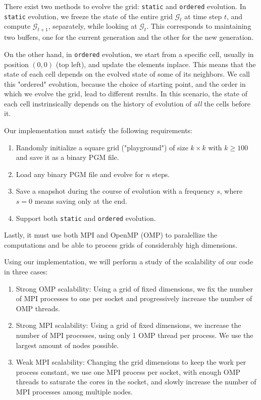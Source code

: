 \documentclass{report}
\begin{document}
There exist two methods to evolve the grid: \texttt{static} and \texttt{ordered}
evolution. In \texttt{static} evolution, we freeze the state of the entire grid 
$\mathcal{G}_t$ at time step $t$, and compute $\mathcal{G}_{t+1}$, separately, 
while looking at $\mathcal{G}_t$. This corresponds to maintaining two buffers, 
one for the current generation and the other for the new generation.

On the other hand, in \texttt{ordered} evolution, we start from a specific cell, 
usually in position $(0,0)$ (top left), and update the elements inplace. This 
means that the state of each cell depends on the evolved state of some of its 
neighbors. We call this "ordered" evolution, because the choice of starting 
point, and the order in which we evolve the grid, lead to different results.
In this scenario, the state of each cell instrinsically depends on the history of 
evolution of \textit{all} the cells before it. 

Our implementation must satisfy the following requirements: 

\begin{enumerate}
    \item Randomly initialize a square grid ("playground") of size $k \times k$ 
        with $k \geq 100$ and save it as a binary PGM\cite{pgm} file.
    \item Load any binary PGM file and evolve for $n$ steps.
    \item Save a snapshot during the course of evolution with a frequency $s$, 
        where $s=0$ means saving only at the end. 
    \item Support both \texttt{static} and \texttt{ordered} evolution.
\end{enumerate}

Lastly, it must use both MPI\cite{mpi} and OpenMP\cite{omp} (OMP) to paralellize 
the computations and be able to process grids of considerably high dimensions. 

Using our implementation, we will perform a study of the scalability of our code 
in three cases: 
\begin{enumerate}
    \item Strong OMP scalability: Using a grid of fixed dimensions, we fix the 
        number of MPI processes to one per socket and progressively increase 
        the number of OMP threads.
    \item Strong MPI scalability: Using a grid of fixed dimensions, we increase 
        the number of MPI processes, using only 1 OMP thread per process. We use 
        the largest amount of nodes possible.
    \item Weak MPI scalability: Changing the grid dimensions to keep the work per 
        process constant, we use one MPI process per socket, with enough OMP 
        threads to saturate the cores in the socket, and slowly increase the 
        number of MPI processes among multiple nodes.
\end{enumerate}
\end{document}
